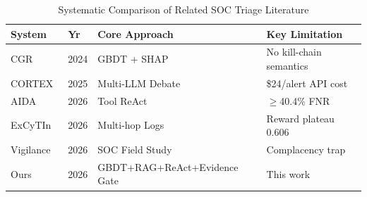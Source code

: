 \begin{table}[t]
\caption{Systematic Comparison of Related SOC Triage Literature}
\label{tab:literature}
\centering
\begin{tabular}{p{1.8cm}p{0.6cm}p{2.5cm}p{3.2cm}}
\toprule
\textbf{System} & \textbf{Yr} & \textbf{Core Approach} & \textbf{Key Limitation} \\
\midrule
CGR~\cite{freitas2024cgr}        & 2024 & GBDT + SHAP        & No kill-chain semantics \\
CORTEX~\cite{wei2025cortex}      & 2025 & Multi-LLM Debate   & \$24/alert API cost \\
AIDA~\cite{tsegai2026aida}       & 2026 & Tool ReAct         & $\geq$40.4\% FNR \\
ExCyTIn~\cite{wu2026excytin}     & 2026 & Multi-hop Logs     & Reward plateau 0.606 \\
Vigilance~\cite{tilbury2026vigilance} & 2026 & SOC Field Study & Complacency trap \\
Ours                             & 2026 & GBDT+RAG+ReAct+Evidence Gate & This work \\
\bottomrule
\end{tabular}
\end{table}
